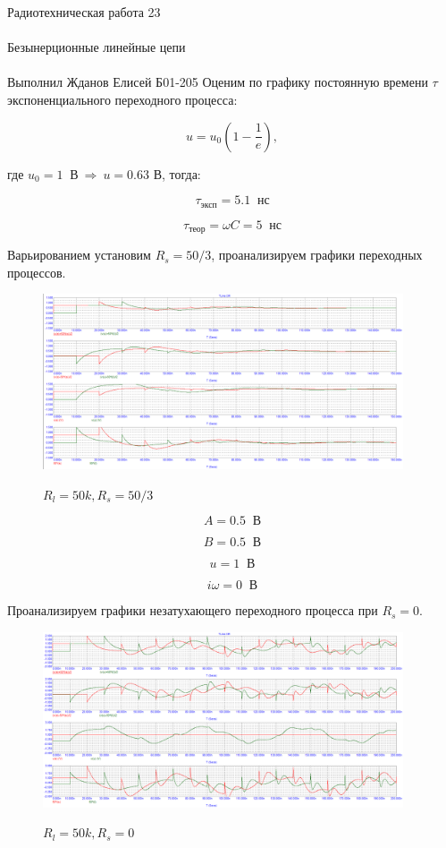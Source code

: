 \documentclass{astroedu-lab}
\begin{document}
\begin{problem}{\huge Радиотехническая работа 23\\\\Безынерционные линейные цепи\\\\Выполнил Жданов Елисей Б01-205}
Оценим по графику постоянную времени $\tau$ экспоненциального переходного процесса:

\[u = u_0 \left(1 - \frac{1}{e}\right),\]

где $u_0 = 1 \: \textit{ В} \: \Rightarrow \: u = 0.63 \textit{ В}$, тогда:

\[\tau_{\text{эксп}} = 5.1 \: \textit{ нс}\]

\[\tau_{\text{теор}} = \omega C = 5 \: \textit{ нс}\]

Варьированием установим $R_s = 50/3$, проанализируем графики переходных процессов.

\begin{figure}[h!]
\centering
\includegraphics[width=0.95\textwidth]{картинки/Graph16.png}
\label{fig:Image1}
\caption{$R_l = 50k, R_s = 50/3$}
\end{figure}

\[A = 0.5 \: \textit{ В}\]

\[B = 0.5 \: \textit{ В}\]

\[u = 1 \: \textit{ В}\]

\[i\omega = 0 \: \textit{ В}\]

Проанализируем графики незатухающего переходного процесса при $R_s = 0$.

\begin{figure}[h!]
\centering
\includegraphics[width=0.95\textwidth]{картинки/Graph17.png}
\label{fig:Image1}
\caption{$R_l = 50k, R_s = 0$}
\end{figure}


\end{problem}
\end{document}
